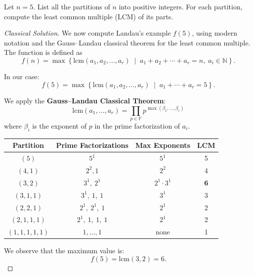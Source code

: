 \documentclass[10pt,a4paper]{amsart}
\begin{document}
\begin{problem}
Let \( n = 5 \). List all the partitions of \( n \) into positive integers. For each partition, compute the least common multiple (LCM) of its parts.
\end{problem}

\begin{proof}[Classical Solution]
 We now compute Landau's example \( f(5) \), using modern notation and the Gauss--Landau classical theorem for the least common multiple. The function is defined as
\[
f(n) = \max \left\{ \mathrm{lcm}(a_1, a_2, \dots, a_r) \;\middle|\; a_1 + a_2 + \cdots + a_r = n,\; a_i \in \mathbb{N} \right\}.
\]

\noindent
In our case:
\[
f(5) = \max \left\{ \mathrm{lcm}(a_1, a_2, \dots, a_r) \;\middle|\; a_1 + \cdots + a_r = 5 \right\}.
\]

\noindent
We apply the \textbf{Gauss--Landau Classical Theorem}:
\[
\mathrm{lcm}(a_1, \dots, a_r) = \prod_{p \in \mathbb{P}} p^{\max(\beta_{1}, \dots, \beta_{r})}
\]
where \( \beta_i \) is the exponent of \( p \) in the prime factorization of \( a_i \).

\vspace{1em}

\begin{center}
\renewcommand{\arraystretch}{1.2}
\begin{tabular}{|c|c|c|c|}
\hline
\textbf{Partition} & \textbf{Prime Factorizations} & \textbf{Max Exponents} & \textbf{LCM} \\
\hline
\( (5) \) & \( 5^1 \) & \( 5^1 \) & 5 \\
\hline
\( (4,1) \) & \( 2^2, 1 \) & \( 2^2 \) & 4 \\
\hline
\( (3,2) \) & \( 3^1,\ 2^1 \) & \( 2^1 \cdot 3^1 \) & \textbf{6} \\
\hline
\( (3,1,1) \) & \( 3^1,\ 1,\ 1 \) & \( 3^1 \) & 3 \\
\hline
\( (2,2,1) \) & \( 2^1,\ 2^1,\ 1 \) & \( 2^1 \) & 2 \\
\hline
\( (2,1,1,1) \) & \( 2^1,\ 1,\ 1,\ 1 \) & \( 2^1 \) & 2 \\
\hline
\( (1,1,1,1,1) \) & \( 1,\dots,1 \) & none & 1 \\
\hline
\end{tabular}
\end{center}

\vspace{1em}

\noindent
We observe that the maximum value is:
\[
f(5) = \mathrm{lcm}(3,2) = 6.
\]
\end{proof}
\end{document}
